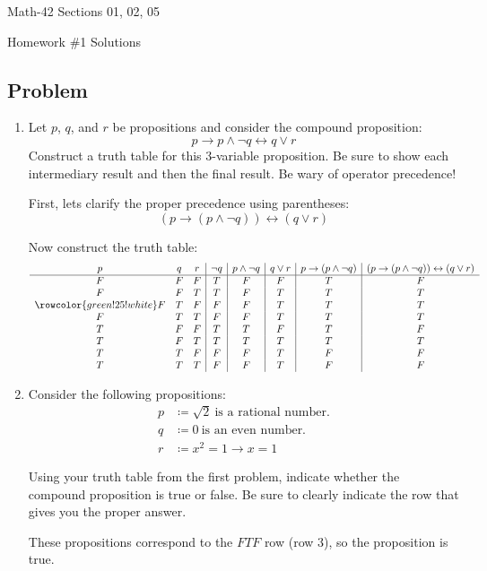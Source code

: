 \documentclass[letterpaper,12pt,fleqn]{article}
\renewcommand{\implies}{\rightarrow}
\renewcommand{\iff}{\leftrightarrow}
\begin{document}
\begin{center}
  \large
  Math-42 Sections 01, 02, 05

  \Large
  Homework \#1 Solutions
\end{center}

\subsection*{Problem}

\begin{enumerate}
\item Let \(p\), \(q\), and \(r\)  be propositions and consider the compound proposition:
  \[p\implies p\land\lnot q\iff q\lor r\]
  Construct a truth table for this 3-variable proposition.  Be sure to show each intermediary result and then the
  final result.  Be wary of operator precedence!

  \bigskip

  First, lets clarify the proper precedence using parentheses:
  \[(p\implies(p\land\lnot q))\iff(q\lor r)\]

  Now construct the truth table:
  \[\begin{array}{ccc|c|c|c|c|c}
  p & q & r & \lnot q & p\land\lnot q & q\lor r & p\implies(p\land\lnot q) &
  (p\implies(p\land\lnot q))\iff(q\lor r) \\
  \hline
  F & F & F & T & F & F & T & F \\
  F & F & T & T & F & T & T & T \\
  \rowcolor{green!25!white}
  F & T & F & F & F & T & T & T \\
  F & T & T & F & F & T & T & T \\
  T & F & F & T & T & F & T & F \\
  T & F & T & T & T & T & T & T \\
  T & T & F & F & F & T & F & F \\
  T & T & T & F & F & T & F & F
  \end{array}\]

\item Consider the following propositions:
  \begin{align*}
    p &\coloneqq\sqrt{2}\ \text{is a rational number.} \\
    q &\coloneqq0\ \text{is an even number.} \\
    r &\coloneqq x^2=1\implies x=1
  \end{align*}

  Using your truth table from the first problem, indicate whether the compound proposition is true or false.  Be sure
  to clearly indicate the row that gives you the proper answer.

  \bigskip

  These propositions correspond to the \(FTF\) row (row \(3\)), so the proposition is true.
\end{enumerate}
\end{document}
